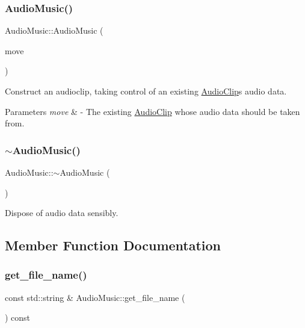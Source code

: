 \subsubsection{\texorpdfstring{Audio\+Music()}{AudioMusic()}\hspace{0.1cm}{\footnotesize\ttfamily [3/3]}}
{\footnotesize\ttfamily Audio\+Music\+::\+Audio\+Music (\begin{DoxyParamCaption}\item[{\mbox{\hyperlink{class_audio_music}{Audio\+Music}} \&\&}]{move }\end{DoxyParamCaption})}

Construct an audioclip, taking control of an existing \mbox{\hyperlink{class_audio_clip}{Audio\+Clip}}\textquotesingle{}s audio data. 
\begin{DoxyParams}{Parameters}
{\em move} & -\/ The existing \mbox{\hyperlink{class_audio_clip}{Audio\+Clip}} whose audio data should be taken from. \\
\hline
\end{DoxyParams}
\mbox{\label{class_audio_music_ab2d3d7df8441d2cca3933a34b1d49e8e}} 
\subsubsection{\texorpdfstring{$\sim$\+Audio\+Music()}{~AudioMusic()}}
{\footnotesize\ttfamily Audio\+Music\+::$\sim$\+Audio\+Music (\begin{DoxyParamCaption}{ }\end{DoxyParamCaption})}

Dispose of audio data sensibly. 

\subsection{Member Function Documentation}
\mbox{\label{class_audio_music_a794b5133068bacd9d5954316c466e781}} 
\subsubsection{\texorpdfstring{get\+\_\+file\+\_\+name()}{get\_file\_name()}}
{\footnotesize\ttfamily const std\+::string \& Audio\+Music\+::get\+\_\+file\+\_\+name (\begin{DoxyParamCaption}{ }\end{DoxyParamCaption}) const}

